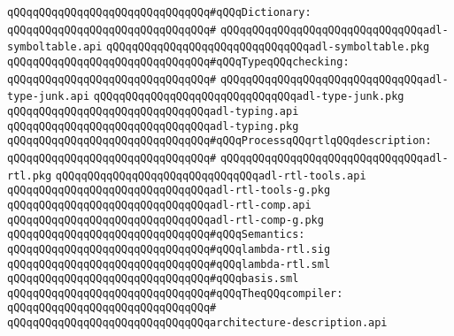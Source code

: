 \verb|qQQqqQQqqQQqqQQqqQQqqQQqqQQqqQQq#qQQqDictionary:|\newline
\verb|qQQqqQQqqQQqqQQqqQQqqQQqqQQqqQQq#|\newline
\verb|qQQqqQQqqQQqqQQqqQQqqQQqqQQqqQQqadl-symboltable.api|\newline
\verb|qQQqqQQqqQQqqQQqqQQqqQQqqQQqqQQqadl-symboltable.pkg|\newline
\newline
\verb|qQQqqQQqqQQqqQQqqQQqqQQqqQQqqQQq#qQQqTypeqQQqchecking:|\newline
\verb|qQQqqQQqqQQqqQQqqQQqqQQqqQQqqQQq#|\newline
\verb|qQQqqQQqqQQqqQQqqQQqqQQqqQQqqQQqadl-type-junk.api|\newline
\verb|qQQqqQQqqQQqqQQqqQQqqQQqqQQqqQQqadl-type-junk.pkg|\newline
\verb|qQQqqQQqqQQqqQQqqQQqqQQqqQQqqQQqadl-typing.api|\newline
\verb|qQQqqQQqqQQqqQQqqQQqqQQqqQQqqQQqadl-typing.pkg|\newline
\newline
\verb|qQQqqQQqqQQqqQQqqQQqqQQqqQQqqQQq#qQQqProcessqQQqrtlqQQqdescription:|\newline
\verb|qQQqqQQqqQQqqQQqqQQqqQQqqQQqqQQq#|\newline
\verb|qQQqqQQqqQQqqQQqqQQqqQQqqQQqqQQqadl-rtl.pkg|\newline
\verb|qQQqqQQqqQQqqQQqqQQqqQQqqQQqqQQqadl-rtl-tools.api|\newline
\verb|qQQqqQQqqQQqqQQqqQQqqQQqqQQqqQQqadl-rtl-tools-g.pkg|\newline
\verb|qQQqqQQqqQQqqQQqqQQqqQQqqQQqqQQqadl-rtl-comp.api|\newline
\verb|qQQqqQQqqQQqqQQqqQQqqQQqqQQqqQQqadl-rtl-comp-g.pkg|\newline
\newline
\verb|qQQqqQQqqQQqqQQqqQQqqQQqqQQqqQQq#qQQqSemantics:|\newline
\verb|qQQqqQQqqQQqqQQqqQQqqQQqqQQqqQQq#qQQqlambda-rtl.sig|\newline
\verb|qQQqqQQqqQQqqQQqqQQqqQQqqQQqqQQq#qQQqlambda-rtl.sml|\newline
\verb|qQQqqQQqqQQqqQQqqQQqqQQqqQQqqQQq#qQQqbasis.sml|\newline
\newline
\verb|qQQqqQQqqQQqqQQqqQQqqQQqqQQqqQQq#qQQqTheqQQqcompiler:|\newline
\verb|qQQqqQQqqQQqqQQqqQQqqQQqqQQqqQQq#|\newline
\verb|qQQqqQQqqQQqqQQqqQQqqQQqqQQqqQQqarchitecture-description.api|\newline
